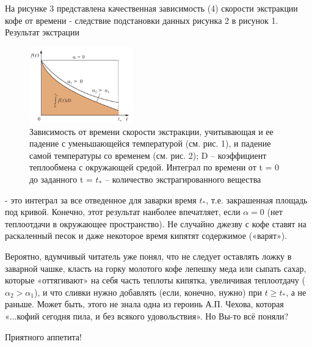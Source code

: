 \begin{multicols}{2}
	На рисунке 3 представлена качественная зависимость (4) скорости экстракции кофе от времени - следствие подстановки
	данных рисунка 2 в рисунок 1. Результат экстрации
	\setlength{\belowcaptionskip}{-20pt} 
	\begin{figure}[H]
		\centering\offinterlineskip
		\includegraphics[width=0.4\textwidth]{pic2.png}
		\caption{Зависимость от времени скорости экстракции, учитывающая и ее падение с уменьшающейся температурой (см. рис. 1), и падение
			самой температуры со временем (см. рис. 2);
			D – коэффициент теплообмена с окружающей
			средой. Интеграл по времени от t = 0 до
			заданного t = $t_*$
			– количество экстрагированного вещества}
	\end{figure}
	\noindent
	- это интеграл за все отведенное для заварки время $t_*$, т.е. закрашенная площадь под кривой. Конечно, этот
	результат наиболее впечатляет, если $\alpha = 0$ (нет теплоотдачи в окружающее пространство). Не случайно
	джезву с кофе ставят на раскаленный песок и даже некоторое время кипятят содержимое («варят»).
	
	Вероятно, вдумчивый читатель уже понял, что не следует оставлять ложку в заварной чашке, класть на горку
	молотого кофе лепешку меда или сыпать сахар, которые «оттягивают» на себя часть теплоты кипятка, увеличивая
	теплоотдачу ($\alpha_2 > \alpha_1$), и что сливки нужно добавлять (если, конечно, нужно) при
	$t\geq t_*$, а не раньше. Может быть, этого не знала одна из героинь А.П. Чехова, которая «...кофий сегодня пила,
	и без всякого удовольствия». Но Вы-то всё поняли?
	
	Приятного аппетита!
\end{multicols}
\newpage
